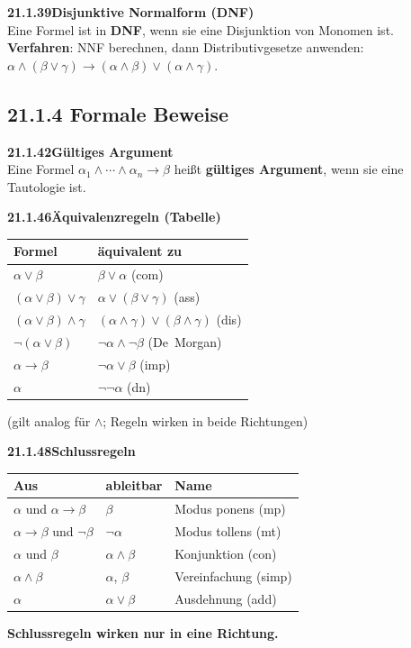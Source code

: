 \documentclass[a4paper,12pt]{article}
\newcommand{\gentry}[3]{%
  \noindent\textbf{#1\quad #2}\nopagebreak\\[0.2em]
  #3\par\smallskip
}
\begin{document}
\gentry{21.1.39}{Disjunktive Normalform (DNF)}{%
  Eine Formel ist in \textbf{DNF}, wenn sie eine Disjunktion von Monomen ist.\\
  \textbf{Verfahren}: NNF berechnen, dann Distributivgesetze anwenden:
  $\alpha \land (\beta \lor \gamma) \to (\alpha \land \beta) \lor (\alpha \land \gamma)$.
}

\subsection*{21.1.4 Formale Beweise}

\gentry{21.1.42}{Gültiges Argument}{%
  Eine Formel $\alpha_1 \land \cdots \land \alpha_n \to \beta$ heißt
  \textbf{gültiges Argument}, wenn sie eine Tautologie ist.
}

\gentry{21.1.46}{Äquivalenzregeln (Tabelle)}{%
  \begin{center}\small
  \begin{tabular}{ll}
    \toprule
    Formel & äquivalent zu\\
    \midrule
    $\alpha \lor \beta$ & $\beta \lor \alpha$ (com)\\
    $(\alpha \lor \beta) \lor \gamma$ & $\alpha \lor (\beta \lor \gamma)$ (ass)\\
    $(\alpha \lor \beta) \land \gamma$ & $(\alpha \land \gamma) \lor (\beta \land \gamma)$ (dis)\\
    $\lnot(\alpha \lor \beta)$ & $\lnot\alpha \land \lnot\beta$ (De~Morgan)\\
    $\alpha \to \beta$ & $\lnot\alpha \lor \beta$ (imp)\\
    $\alpha$ & $\lnot\lnot\alpha$ (dn)\\
    \bottomrule
  \end{tabular}
  \end{center}
  (gilt analog für $\land$; Regeln wirken in beide Richtungen)
}

\gentry{21.1.48}{Schlussregeln}{%
  \begin{center}\small
  \begin{tabular}{lll}
    \toprule
    Aus & ableitbar & Name\\
    \midrule
    $\alpha$ und $\alpha \to \beta$ & $\beta$ & Modus ponens (mp)\\
    $\alpha \to \beta$ und $\lnot\beta$ & $\lnot\alpha$ & Modus tollens (mt)\\
    $\alpha$ und $\beta$ & $\alpha \land \beta$ & Konjunktion (con)\\
    $\alpha \land \beta$ & $\alpha$,\; $\beta$ & Vereinfachung (simp)\\
    $\alpha$ & $\alpha \lor \beta$ & Ausdehnung (add)\\
    \bottomrule
  \end{tabular}
  \end{center}
  \textbf{Schlussregeln wirken nur in eine Richtung.}
}
\end{document}
